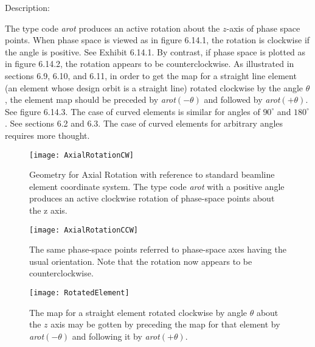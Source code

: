 \vspace{5mm}
     Description:
\vspace{2mm}

         The type code {\em arot } produces an active rotation about the $z$-axis of
phase space points.    When phase space is viewed as in figure 6.14.1, the
rotation is clockwise if the angle is positive.  See Exhibit 6.14.1.  By
contrast, if phase space is plotted as in figure 6.14.2, the rotation
appears to be counterclockwise.
         As illustrated in sections 6.9, 6.10, and 6.11, in order to get
the map for a straight line element (an element whose design orbit is a
straight line) rotated clockwise by the angle $\theta$, the element map should
be preceded by {\em arot}$(-\theta)$ and followed by {\em
arot}$(+\theta)$.  See figure 6.14.3. The
case of curved elements is similar for angles of $90^\circ$ and $180^\circ$.  See
sections 6.2 and 6.3.  The case of curved elements for arbitrary angles
requires more thought.


\begin{figure}[p]
  \centering
  \texttt{[image: AxialRotationCW]}
  \caption{Geometry for Axial Rotation with reference to standard beamline element coordinate system.  The type code {\em arot } with a positive angle
produces an active clockwise rotation of phase-space points about the z
axis.}
\end{figure}



\begin{figure}[p]
  \centering
  \texttt{[image: AxialRotationCCW]}
  \caption{The same phase-space points referred to phase-space axes
having the usual orientation.  Note that the rotation now appears to be
counterclockwise.}
\end{figure}


\begin{figure}[p]
  \centering
  \texttt{[image: RotatedElement]}
  \caption{The map for a straight element rotated clockwise by angle $\theta$ about
the $z$ axis may be gotten by preceding the map for that element by {\em arot}$(-\theta)$
and following it by {\em arot}$(+\theta)$.}
\end{figure}


